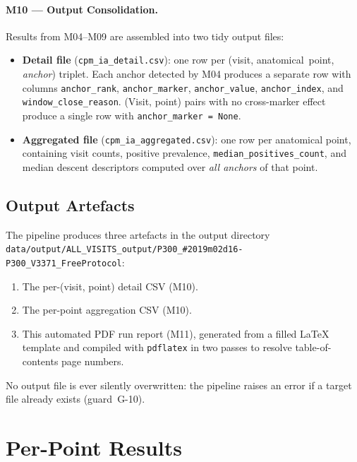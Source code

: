 \documentclass[a4paper,11pt]{article}
\begin{document}
\paragraph{M10 --- Output Consolidation.}
Results from M04--M09 are assembled into two tidy output files:
\begin{itemize}
  \item \textbf{Detail file} (\texttt{cpm\_ia\_detail.csv}): one row per
        (visit, anatomical~point, \emph{anchor}) triplet. Each anchor detected by M04
        produces a separate row with columns \texttt{anchor\_rank},
        \texttt{anchor\_marker}, \texttt{anchor\_value}, \texttt{anchor\_index},
        and \texttt{window\_close\_reason}.
        (Visit, point) pairs with no cross-marker effect produce a single row with
        \texttt{anchor\_marker = None}.
  \item \textbf{Aggregated file} (\texttt{cpm\_ia\_aggregated.csv}): one row per
        anatomical point, containing visit counts, positive prevalence,
        \texttt{median\_positives\_count}, and median descent descriptors computed over
        \emph{all anchors} of that point.
\end{itemize}

\subsection{Output Artefacts}

The pipeline produces three artefacts in the output directory \texttt{data/output/ALL\_VISITS\_output/P300\_\#2019m02d16-P300\_V3371\_FreeProtocol}:
\begin{enumerate}
  \item The per-(visit, point) detail CSV (M10).
  \item The per-point aggregation CSV (M10).
  \item This automated PDF run report (M11), generated from a filled \LaTeX{} template
        and compiled with \texttt{pdflatex} in two passes to resolve table-of-contents
        page numbers.
\end{enumerate}
No output file is ever silently overwritten: the pipeline raises an error if a target
file already exists (guard~G-10).

\section{Per-Point Results}
\end{document}
